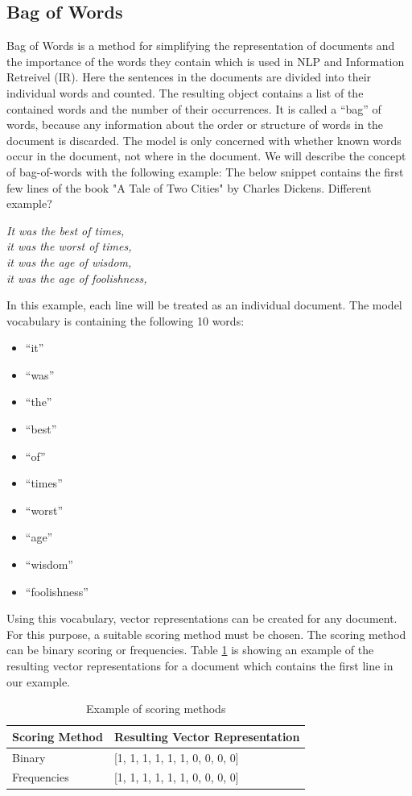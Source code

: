 \subsection{Bag of Words}
Bag of Words is a method for simplifying the representation of documents and the importance of the words they contain which is used in NLP and Information Retreivel (IR). Here the sentences in the documents are divided into their individual words and counted. The resulting object contains a list of the contained words and the number of their occurrences. It is called a “bag” of words, because any information about the order or structure of words in the document is discarded. The model is only concerned with whether known words occur in the document, not where in the document. We will describe the concept of bag-of-words with the following example: The below snippet contains the first few lines of \alert{the book "A Tale of Two Cities" by Charles Dickens. Different example?}


\textit{
\centering	
It was the best of times,\\
it was the worst of times,\\
it was the age of wisdom,\\
it was the age of foolishness, \\
}

In this example, each line will be treated as an individual document. The model vocabulary is containing the following 10 words:
\begin{itemize}
	\item “it”
	\item “was”
	\item “the”
	\item “best”
	\item “of”
	\item “times”
	\item “worst”
	\item “age”
	\item “wisdom”
	\item “foolishness”
\end{itemize}

Using this vocabulary, vector representations can be created for any document. For this purpose, a suitable scoring method must be chosen. The scoring method can be binary scoring or frequencies. Table \ref{tab:scoring} is showing an example of the resulting vector representations for a document which contains the first line in our example.

\begin{table}[H]
	\centering
	\begin{tabular}{ll}
		\hline
		\textbf{Scoring Method} & \textbf{Resulting Vector Representation}                                         \\ \hline
		Binary & [1, 1, 1, 1, 1, 1, 0, 0, 0, 0] \\ \hline
		Frequencies & [1, 1, 1, 1, 1, 1, 0, 0, 0, 0] \\ \hline
	\end{tabular}
	\caption{Example of scoring methods}
	\label{tab:scoring}
\end{table}



